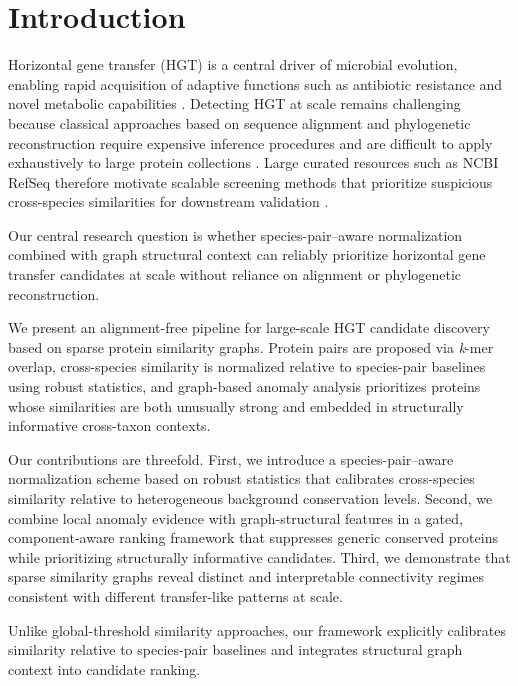 \documentclass[11pt]{article}
\begin{document}
\section{Introduction}

Horizontal gene transfer (HGT) is a central driver of microbial evolution, enabling rapid
acquisition of adaptive functions such as antibiotic resistance and novel metabolic capabilities \cite{Koonin2001,Davies2000}. Detecting HGT at scale remains challenging because classical approaches based on sequence alignment and phylogenetic reconstruction require expensive inference procedures and are difficult to apply exhaustively to large protein collections \cite{Ragan2001,Philippe2011}. Large curated resources such as NCBI RefSeq therefore motivate scalable screening methods that prioritize suspicious cross-species similarities for downstream validation \cite{OLeary2016}.

Our central research question is whether species-pair–aware normalization combined with graph structural context can reliably prioritize horizontal gene transfer candidates at scale without reliance on alignment or phylogenetic reconstruction.

We present an alignment-free pipeline for large-scale HGT candidate discovery based on sparse
protein similarity graphs. Protein pairs are proposed via \textit{k}-mer overlap, cross-species similarity is normalized relative to species-pair baselines using robust statistics, and graph-based anomaly analysis prioritizes proteins whose similarities are both unusually strong and embedded in structurally informative cross-taxon contexts.

Our contributions are threefold. First, we introduce a species-pair–aware normalization scheme
based on robust statistics that calibrates cross-species similarity relative to heterogeneous
background conservation levels. Second, we combine local anomaly evidence with graph-structural
features in a gated, component-aware ranking framework that suppresses generic conserved
proteins while prioritizing structurally informative candidates. Third, we demonstrate that sparse similarity graphs reveal distinct and interpretable connectivity regimes consistent with different transfer-like patterns at scale.

Unlike global-threshold similarity approaches, our framework explicitly calibrates similarity
relative to species-pair baselines and integrates structural graph context into candidate ranking.
\end{document}
